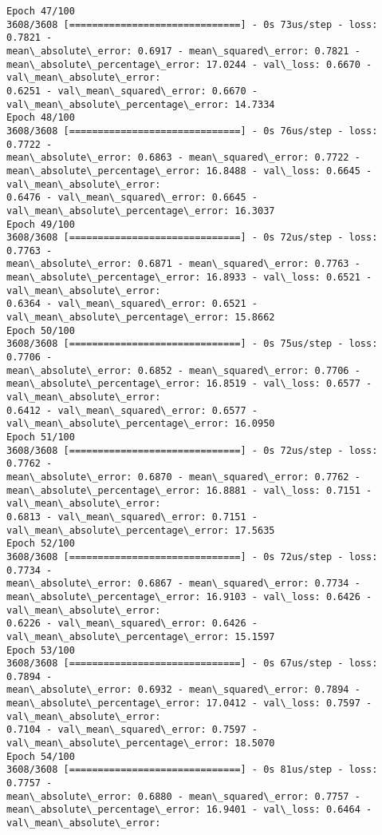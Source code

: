 \documentclass[11pt]{article}
\begin{document}
\begin{Verbatim}[commandchars=\\\{\},fontsize=\footnotesize]
Epoch 47/100
3608/3608 [==============================] - 0s 73us/step - loss: 0.7821 -
mean\_absolute\_error: 0.6917 - mean\_squared\_error: 0.7821 -
mean\_absolute\_percentage\_error: 17.0244 - val\_loss: 0.6670 - val\_mean\_absolute\_error:
0.6251 - val\_mean\_squared\_error: 0.6670 - val\_mean\_absolute\_percentage\_error: 14.7334
Epoch 48/100
3608/3608 [==============================] - 0s 76us/step - loss: 0.7722 -
mean\_absolute\_error: 0.6863 - mean\_squared\_error: 0.7722 -
mean\_absolute\_percentage\_error: 16.8488 - val\_loss: 0.6645 - val\_mean\_absolute\_error:
0.6476 - val\_mean\_squared\_error: 0.6645 - val\_mean\_absolute\_percentage\_error: 16.3037
Epoch 49/100
3608/3608 [==============================] - 0s 72us/step - loss: 0.7763 -
mean\_absolute\_error: 0.6871 - mean\_squared\_error: 0.7763 -
mean\_absolute\_percentage\_error: 16.8933 - val\_loss: 0.6521 - val\_mean\_absolute\_error:
0.6364 - val\_mean\_squared\_error: 0.6521 - val\_mean\_absolute\_percentage\_error: 15.8662
Epoch 50/100
3608/3608 [==============================] - 0s 75us/step - loss: 0.7706 -
mean\_absolute\_error: 0.6852 - mean\_squared\_error: 0.7706 -
mean\_absolute\_percentage\_error: 16.8519 - val\_loss: 0.6577 - val\_mean\_absolute\_error:
0.6412 - val\_mean\_squared\_error: 0.6577 - val\_mean\_absolute\_percentage\_error: 16.0950
Epoch 51/100
3608/3608 [==============================] - 0s 72us/step - loss: 0.7762 -
mean\_absolute\_error: 0.6870 - mean\_squared\_error: 0.7762 -
mean\_absolute\_percentage\_error: 16.8881 - val\_loss: 0.7151 - val\_mean\_absolute\_error:
0.6813 - val\_mean\_squared\_error: 0.7151 - val\_mean\_absolute\_percentage\_error: 17.5635
Epoch 52/100
3608/3608 [==============================] - 0s 72us/step - loss: 0.7734 -
mean\_absolute\_error: 0.6867 - mean\_squared\_error: 0.7734 -
mean\_absolute\_percentage\_error: 16.9103 - val\_loss: 0.6426 - val\_mean\_absolute\_error:
0.6226 - val\_mean\_squared\_error: 0.6426 - val\_mean\_absolute\_percentage\_error: 15.1597
Epoch 53/100
3608/3608 [==============================] - 0s 67us/step - loss: 0.7894 -
mean\_absolute\_error: 0.6932 - mean\_squared\_error: 0.7894 -
mean\_absolute\_percentage\_error: 17.0412 - val\_loss: 0.7597 - val\_mean\_absolute\_error:
0.7104 - val\_mean\_squared\_error: 0.7597 - val\_mean\_absolute\_percentage\_error: 18.5070
Epoch 54/100
3608/3608 [==============================] - 0s 81us/step - loss: 0.7757 -
mean\_absolute\_error: 0.6880 - mean\_squared\_error: 0.7757 -
mean\_absolute\_percentage\_error: 16.9401 - val\_loss: 0.6464 - val\_mean\_absolute\_error:

\end{Verbatim}
\end{document}
